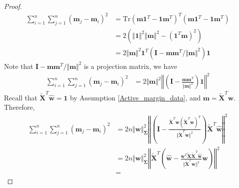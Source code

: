 \documentclass[pdflatex,sn-basic]{sn-jnl}%
\theoremstyle{thmstyleone}%
\begin{document}
\begin{appendices}
\begin{proof}
\begin{equation*}
  \begin{aligned}
    \sum_{i=1}^{n} \sum_{j=1}^{n}
    \left(
      \mathbf{m}_j -  \mathbf{m}_i 
    \right)^2
    & = 
    \text{Tr} \left( \mathbf{m} \mathbf{1}^{T} - \mathbf{1} \mathbf{m}^T \right)^T \left(
      \mathbf{m} \mathbf{1}^{T} - \mathbf{1} \mathbf{m}^T
    \right)
    \\ & = 
    2 \left(
      \Vert \mathbf{1} \Vert^2 \Vert \mathbf{m} \Vert^2 - \left( \mathbf{1}^T \mathbf{m} \right)^2
    \right)
    \\ & = 
    2 \Vert \mathbf{m} \Vert^2 \mathbf{1}^{T} \left(
      \mathbf{I} - \mathbf{m} \mathbf{m}^{T} / \Vert \mathbf{m} \Vert^{2}
    \right)
    \mathbf{1}
  \end{aligned}
  \end{equation*}
  Note that $\mathbf{I} - \mathbf{m} \mathbf{m}^{T} / \Vert \mathbf{m} \Vert^{2}$ is a projection matrix, we have 
  \begin{equation*}
  \begin{aligned}
    \sum_{i=1}^{n} \sum_{j=1}^{n}
    \left(
      \mathbf{m}_j -  \mathbf{m}_i 
    \right)^2
    & = 
    2 \Vert \mathbf{m} \Vert^2 
    \left\Vert
      \left(
        \mathbf{I} - \frac{\mathbf{m} \mathbf{m}^{T}}{ \Vert \mathbf{m} \Vert^{2}}
      \right)
      \mathbf{1}
    \right\Vert^2
  \end{aligned}
  \end{equation*}
  Recall that $\tilde{\mathbf{X}}^T \hat{\mathbf{w}} = \mathbf{1}$ by Assumption \ref{Active_margin_data}, and $\mathbf{m} = \tilde{\mathbf{X}}^{T} \mathbf{w}$. Therefore,
  \begin{equation}\label{eq:pairwise_margin_sum_projection}
  \begin{aligned}
    \sum_{i=1}^{n} \sum_{j=1}^{n}
    \left(
      \mathbf{m}_j -  \mathbf{m}_i 
    \right)^2
    & = 
    2 n \Vert \mathbf{w} \Vert_{\mathbf{\Sigma}}^2 
    \left\Vert
      \left(
        \mathbf{I} - \frac{\tilde{\mathbf{X}}^{T} \mathbf{w} \left(\tilde{\mathbf{X}}^{T} \mathbf{w}\right)^{T}}{ \Vert \tilde{\mathbf{X}}^{T} \mathbf{w} \Vert^{2}}
      \right)
      \tilde{\mathbf{X}}^T \hat{\mathbf{w}}
    \right\Vert^2
    \\ & = 
    2 n \Vert \mathbf{w} \Vert_{\mathbf{\Sigma}}^2 
    \left\Vert
    \tilde{\mathbf{X}}^T
      \left(
        \hat{\mathbf{w}} - \frac{\mathbf{w}^{T} \tilde{\mathbf{X}} \tilde{\mathbf{X}}^{T} \hat{\mathbf{w}} }{ \Vert \tilde{\mathbf{X}}^{T} \mathbf{w} \Vert^{2}} \mathbf{w}
      \right)
    \right\Vert^2
    \\ & = 

\end{aligned}
\end{equation}
\end{proof}
\end{appendices}
\end{document}
